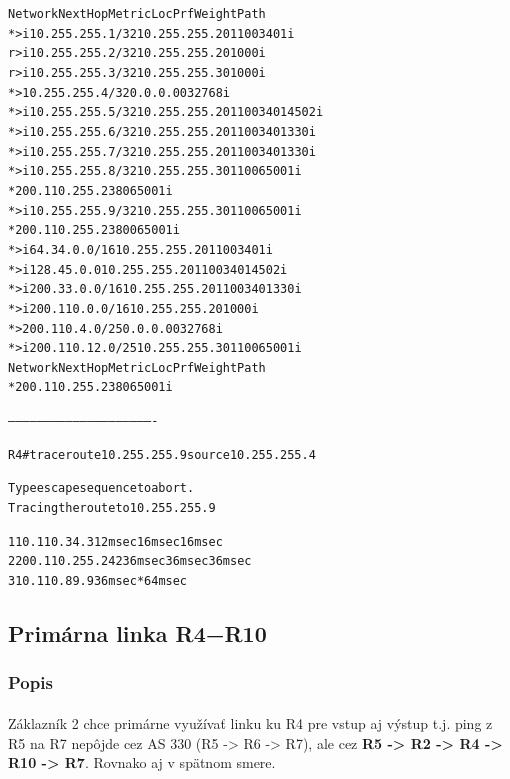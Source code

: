 \documentclass[12pt,twoside,a4paper]{report}
\begin{document}
{\begin{small}
\begin{alltt}
   Network          Next Hop            Metric LocPrf Weight Path
*>i10.255.255.1/32  10.255.255.2             0    110      0 3401 i
r>i10.255.255.2/32  10.255.255.2             0    100      0 i
r>i10.255.255.3/32  10.255.255.3             0    100      0 i
*> 10.255.255.4/32  0.0.0.0                  0         32768 i
*>i10.255.255.5/32  10.255.255.2             0    110      0 3401 4502 i
*>i10.255.255.6/32  10.255.255.2             0    110      0 3401 330 i
*>i10.255.255.7/32  10.255.255.2             0    110      0 3401 330 i
*>i10.255.255.8/32  10.255.255.3             0    110      0 65001 i
*                   200.110.255.238                        0 65001 i
*>i10.255.255.9/32  10.255.255.3             0    110      0 65001 i
*                   200.110.255.238          0             0 65001 i
*>i64.34.0.0/16     10.255.255.2             0    110      0 3401 i
*>i128.45.0.0       10.255.255.2             0    110      0 3401 4502 i
*>i200.33.0.0/16    10.255.255.2             0    110      0 3401 330 i
*>i200.110.0.0/16   10.255.255.2             0    100      0 i
*> 200.110.4.0/25   0.0.0.0                  0         32768 i
*>i200.110.12.0/25  10.255.255.3             0    110      0 65001 i
   Network          Next Hop            Metric LocPrf Weight Path
*                   200.110.255.238                        0 65001 i


-------------------------------------------------------------


R4#traceroute 10.255.255.9 source 10.255.255.4

Type escape sequence to abort.
Tracing the route to 10.255.255.9

  1 10.110.34.3 12 msec 16 msec 16 msec
  2 200.110.255.242 36 msec 36 msec 36 msec
  3 10.110.89.9 36 msec *  64 msec

\end{alltt}
\end{small}
}







\subsection{Primárna linka R4−R10}
\subsubsection{Popis}
\paragraph{}
Záklazník 2 chce primárne využívať linku ku R4 pre vstup aj výstup t.j. ping z R5 na R7 nepôjde cez AS 330 (R5 -\textgreater{} R6 -\textgreater{} R7), ale cez \textbf{R5 -\textgreater{} R2 -\textgreater{} R4 -\textgreater{} R10 -\textgreater{} R7}. Rovnako aj v spätnom smere.
\end{document}
